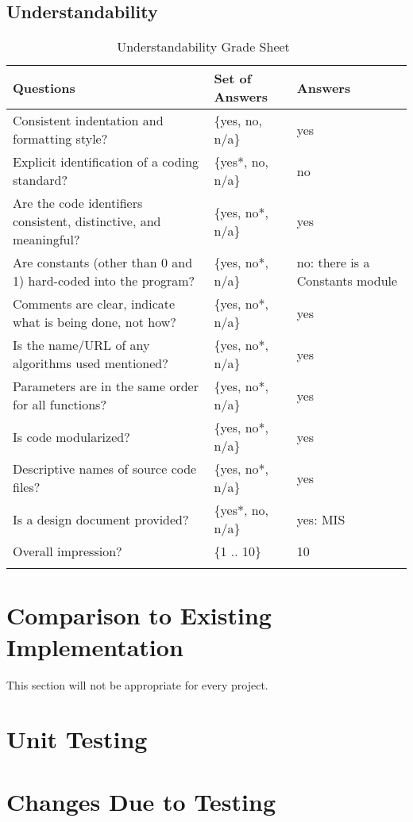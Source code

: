 \documentclass[12pt, titlepage]{article}
\begin{document}
\subsection{Understandability}

\begin{longtable}{p{7cm} p{3cm} p{5cm}}
\toprule
Questions & Set of Answers & Answers\\ \midrule
Consistent indentation and formatting style? & \{yes, no, n/a\} & yes\\
Explicit identification of a coding standard? & \{yes*, no, n/a\} & no\\
Are the code identifiers consistent, distinctive, and meaningful? & \{yes, no*,
n/a\} & yes\\
Are constants (other than 0 and 1) hard-coded into the program? & \{yes, no*,
n/a\} & no: there is a Constants module\\
Comments are clear, indicate what is being done, not how? & \{yes, no*, n/a\} &
yes
\\Is the name/URL of any algorithms used mentioned? & \{yes, no*, n/a\} & yes\\
Parameters are in the same order for all functions? & \{yes, no*, n/a\} & yes\\
Is code modularized? & \{yes, no*, n/a\} & yes\\
Descriptive names of source code files? & \{yes, no*, n/a\} & yes\\
Is a design document provided? & \{yes*, no, n/a\} & yes: MIS
\cite{Dong2019MIS}\\
Overall impression? & \{1 .. 10\} & 10\\ \bottomrule
\caption{Understandability Grade Sheet~\cite{SmithEtAl2018}}
\label{Tb_understandability}
\end{longtable}

\section{Comparison to Existing Implementation}	

This section will not be appropriate for every project.

\section{Unit Testing}

\section{Changes Due to Testing}
\end{document}
